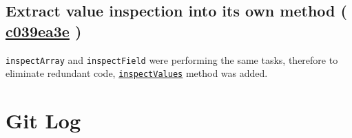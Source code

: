 \documentclass{article}
\newcommand{\code}[1]{\texttt{#1}}
\newcommand{\gh}[1]{%
  \href{https://github.com/awave1/ObjectInspector/commit/#1}{#1}%
}
\begin{document}
\subsection*{Extract value inspection into its own method (\gh{c039ea3e})}

\code{inspectArray} and \code{inspectField} were performing the same tasks, therefore to eliminate redundant code, \href{https://github.com/awave1/ObjectInspector/blob/master/src/main/java/inspector/Inspector.java#L181}{\code{inspectValues}} method was added.

\section*{Git Log}

\end{document}
